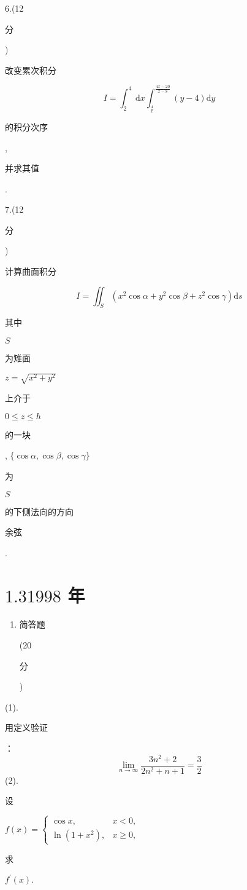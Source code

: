 \documentclass[10pt]{article}
\begin{document}
6.(12 \begin{CJK}{UTF8}{mj}分\end{CJK}) \begin{CJK}{UTF8}{mj}改变累次积分\end{CJK}
$$
I=\int_{2}^{4} \mathrm{~d} x \int_{\frac{4}{x}}^{\frac{4 x-20}{x-8}}(y-4) \mathrm{d} y
$$
\begin{CJK}{UTF8}{mj}的积分次序\end{CJK}, \begin{CJK}{UTF8}{mj}并求其值\end{CJK}.

7.(12 \begin{CJK}{UTF8}{mj}分\end{CJK}) \begin{CJK}{UTF8}{mj}计算曲面积分\end{CJK}
$$
I=\iint_{S}\left(x^{2} \cos \alpha+y^{2} \cos \beta+z^{2} \cos \gamma\right) \mathrm{d} s
$$
\begin{CJK}{UTF8}{mj}其中\end{CJK} $S$ \begin{CJK}{UTF8}{mj}为雉面\end{CJK} $z=\sqrt{x^{2}+y^{2}}$ \begin{CJK}{UTF8}{mj}上介于\end{CJK} $0 \leqslant z \leqslant h$ \begin{CJK}{UTF8}{mj}的一块\end{CJK}, $\{\cos \alpha, \cos \beta, \cos \gamma\}$ \begin{CJK}{UTF8}{mj}为\end{CJK} $S$ \begin{CJK}{UTF8}{mj}的下侧法向的方向\end{CJK} \begin{CJK}{UTF8}{mj}余弦\end{CJK}.

\section{$1.31998$ 年}
\begin{enumerate}
  \item \begin{CJK}{UTF8}{mj}简答题\end{CJK} (20 \begin{CJK}{UTF8}{mj}分\end{CJK})
\end{enumerate}
(1). \begin{CJK}{UTF8}{mj}用定义验证\end{CJK}：
$$
\lim _{n \rightarrow \infty} \frac{3 n^{2}+2}{2 n^{2}+n+1}=\frac{3}{2}
$$
(2). \begin{CJK}{UTF8}{mj}设\end{CJK} $f(x)=\left\{\begin{array}{ll}\cos x, & x<0, \\ \ln \left(1+x^{2}\right), & x \geqslant 0,\end{array}\right.$ \begin{CJK}{UTF8}{mj}求\end{CJK} $f^{\prime}(x)$.
\end{document}
